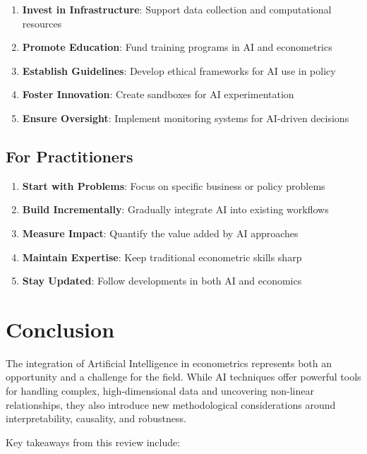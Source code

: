 \documentclass[12pt,a4paper]{article}
\begin{document}
{\begin{enumerate}
    \item \textbf{Invest in Infrastructure}: Support data collection and computational resources
    \item \textbf{Promote Education}: Fund training programs in AI and econometrics
    \item \textbf{Establish Guidelines}: Develop ethical frameworks for AI use in policy
    \item \textbf{Foster Innovation}: Create sandboxes for AI experimentation
    \item \textbf{Ensure Oversight}: Implement monitoring systems for AI-driven decisions
\end{enumerate}

\subsection{For Practitioners}

\begin{enumerate}
    \item \textbf{Start with Problems}: Focus on specific business or policy problems
    \item \textbf{Build Incrementally}: Gradually integrate AI into existing workflows
    \item \textbf{Measure Impact}: Quantify the value added by AI approaches
    \item \textbf{Maintain Expertise}: Keep traditional econometric skills sharp
    \item \textbf{Stay Updated}: Follow developments in both AI and economics
\end{enumerate}

\section{Conclusion}

The integration of Artificial Intelligence in econometrics represents both an opportunity and a challenge for the field. While AI techniques offer powerful tools for handling complex, high-dimensional data and uncovering non-linear relationships, they also introduce new methodological considerations around interpretability, causality, and robustness.

Key takeaways from this review include:

}
\end{document}
